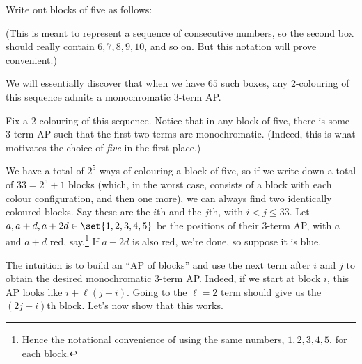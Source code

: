 Write out blocks of five as follows:

\begin{figure}[h] %
    \centering
\end{figure}

(This is meant to represent a sequence of consecutive numbers, so the second box should really contain $6, 7, 8, 9, 10$, and so on. But this notation will prove convenient.)

We will essentially discover that when we have $65$ such boxes, any $2$-colouring of this sequence admits a monochromatic $3$-term AP.

Fix a $2$-colouring of this sequence. Notice that in any block of five, there is some $3$-term AP such that the first two terms are monochromatic. (Indeed, this is what motivates the choice of \textit{five} in the first place.)

We have a total of $2^5$ ways of colouring a block of five, so if we write down a total of $33 = 2^5 + 1$ blocks (which, in the worst case, consists of a block with each colour configuration, and then one more), we can always find two identically coloured blocks. Say these are the $i$th and the $j$th, with $i < j \leq 33$. Let $a, a + d, a + 2d \in \set{1, 2, 3, 4, 5}$ be the positions of their $3$-term AP, with $a$ and $a + d$ red, say.\footnote{Hence the notational convenience of using the same numbers, $1, 2, 3, 4, 5$, for each block.} If $a + 2d$ is also red, we're done, so suppose it is blue.

The intuition is to build an ``AP of blocks'' and use the next term after $i$ and $j$ to obtain the desired monochromatic $3$-term AP. Indeed, if we start at block $i$, this AP looks like $i + \ell (j - i)$. Going to the $\ell = 2$ term should give us the $(2j - i)$th block. Let's now show that this works.

